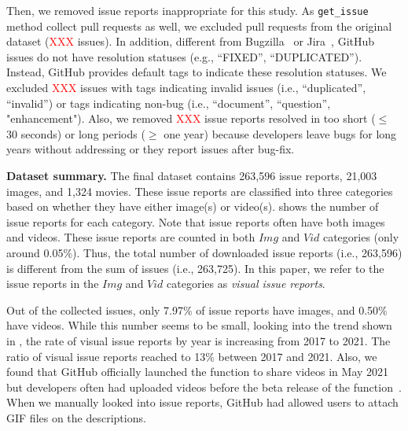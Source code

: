 Then, we removed issue reports inappropriate for this study. As \texttt{get\_issue} method collect pull requests as well, we excluded pull requests from the original dataset (\textcolor{red}{XXX} issues).  
In addition, different from Bugzilla~\citep{Bugzilla} or Jira~\citep{JIRA}, GitHub issues do not have resolution statuses (e.g., ``FIXED'', ``DUPLICATED''). 
Instead,  GitHub provides default tags to indicate these resolution statuses. 
We excluded \textcolor{red}{XXX} issues with tags indicating invalid issues (i.e., ``duplicated'', ``invalid'') or tags indicating non-bug (i.e., ``document'', ``question'', "enhancement"). Also, we removed \textcolor{red}{XXX} issue reports resolved in too short ($\leq$ 30 seconds) or long periods  ($\geq$ one year) because developers leave bugs for long years without addressing or they report issues after bug-fix. 


{\bf Dataset summary.} The final dataset contains 263,596 issue reports,  21,003 images, and 1,324 movies. 
These issue reports are classified into three categories based on whether they have either image(s) or video(s). 
 shows the number of issue reports for each category. 
Note that issue reports often have both images and videos. 
These issue reports are counted in both $Img$ and $Vid$ categories (only around 0.05\%). 
Thus, the total number of downloaded issue reports (i.e., 263,596) is different from the sum of issues (i.e., 263,725).
In this paper, we refer to the issue reports in the $Img$ and $Vid$ categories
as \textit{visual issue reports}. 


Out of the collected issues, only 7.97\% of issue reports have images, and 0.50\% have videos. 
While this number seems to be small, looking into the trend shown in , the rate of visual issue reports by year is increasing from 2017 to 2021. 
The ratio of visual issue reports reached to 13\% between 2017 and 2021. 
Also, we found that GitHub officially launched the function to share videos in May 2021 but developers often had uploaded videos before the beta release of the function~\citep{github-video-blog-beta}. 
When we manually looked into issue reports, GitHub had allowed users to attach GIF files on the descriptions.

% 
%

